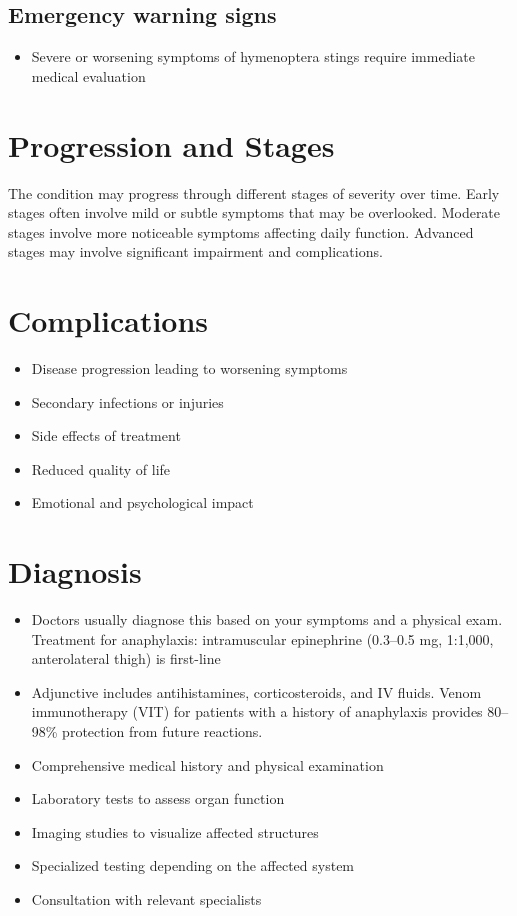 \subsection{Emergency warning signs}
\begin{itemize}[noitemsep]
  \item Severe or worsening symptoms of hymenoptera stings require immediate medical evaluation
\end{itemize}
\section{Progression and Stages}
The condition may progress through different stages of severity over time. Early stages often involve mild or subtle symptoms that may be overlooked. Moderate stages involve more noticeable symptoms affecting daily function. Advanced stages may involve significant impairment and complications.
\section{Complications}
\begin{itemize}[noitemsep]
  \item Disease progression leading to worsening symptoms
  \item Secondary infections or injuries
  \item Side effects of treatment
  \item Reduced quality of life
  \item Emotional and psychological impact
\end{itemize}
\section{Diagnosis}
\begin{itemize}[noitemsep]
  \item Doctors usually diagnose this based on your symptoms and a physical exam. Treatment for anaphylaxis: intramuscular epinephrine (0.3--0.5 mg, 1:1,000, anterolateral thigh) is first-line
  \item Adjunctive includes antihistamines, corticosteroids, and IV fluids. Venom immunotherapy (VIT) for patients with a history of anaphylaxis provides 80--98\% protection from future reactions.
  \item Comprehensive medical history and physical examination
  \item Laboratory tests to assess organ function
  \item Imaging studies to visualize affected structures
  \item Specialized testing depending on the affected system
  \item Consultation with relevant specialists
\end{itemize}
